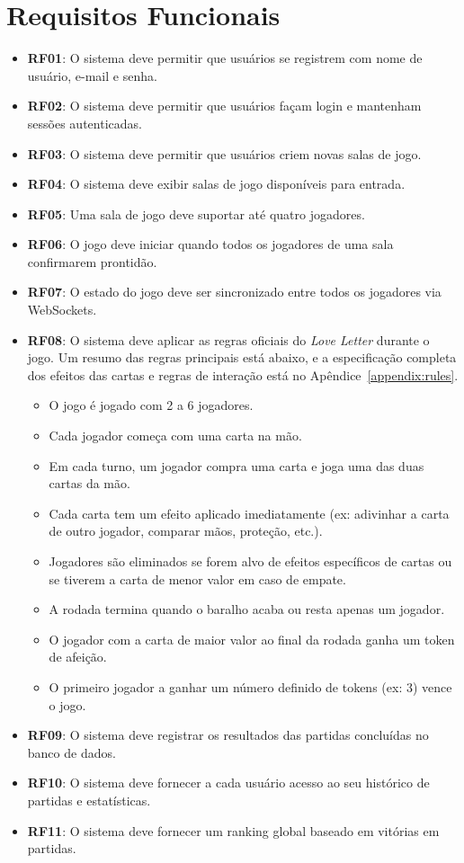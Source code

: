 \documentclass{scrreprt}
\begin{document}
\section{Requisitos Funcionais}
\begin{itemize}
    \item \textbf{RF01}: O sistema deve permitir que usuários se registrem com nome de usuário, e-mail e senha.
    \item \textbf{RF02}: O sistema deve permitir que usuários façam login e mantenham sessões autenticadas.
    \item \textbf{RF03}: O sistema deve permitir que usuários criem novas salas de jogo.
    \item \textbf{RF04}: O sistema deve exibir salas de jogo disponíveis para entrada.
    \item \textbf{RF05}: Uma sala de jogo deve suportar até quatro jogadores.
    \item \textbf{RF06}: O jogo deve iniciar quando todos os jogadores de uma sala confirmarem prontidão.
    \item \textbf{RF07}: O estado do jogo deve ser sincronizado entre todos os jogadores via WebSockets.
    \item \textbf{RF08}: O sistema deve aplicar as regras oficiais do \textit{Love Letter} durante o jogo. Um resumo das regras principais está abaixo, e a especificação completa dos efeitos das cartas e regras de interação está no Apêndice~\ref{appendix:rules}.
    \begin{itemize}
        \item O jogo é jogado com 2 a 6 jogadores.
        \item Cada jogador começa com uma carta na mão.
        \item Em cada turno, um jogador compra uma carta e joga uma das duas cartas da mão.
        \item Cada carta tem um efeito aplicado imediatamente (ex: adivinhar a carta de outro jogador, comparar mãos, proteção, etc.).
        \item Jogadores são eliminados se forem alvo de efeitos específicos de cartas ou se tiverem a carta de menor valor em caso de empate.
        \item A rodada termina quando o baralho acaba ou resta apenas um jogador.
        \item O jogador com a carta de maior valor ao final da rodada ganha um token de afeição.
        \item O primeiro jogador a ganhar um número definido de tokens (ex: 3) vence o jogo.
    \end{itemize}
    \item \textbf{RF09}: O sistema deve registrar os resultados das partidas concluídas no banco de dados.
    \item \textbf{RF10}: O sistema deve fornecer a cada usuário acesso ao seu histórico de partidas e estatísticas.
    \item \textbf{RF11}: O sistema deve fornecer um ranking global baseado em vitórias em partidas.
\end{itemize}
\end{document}
